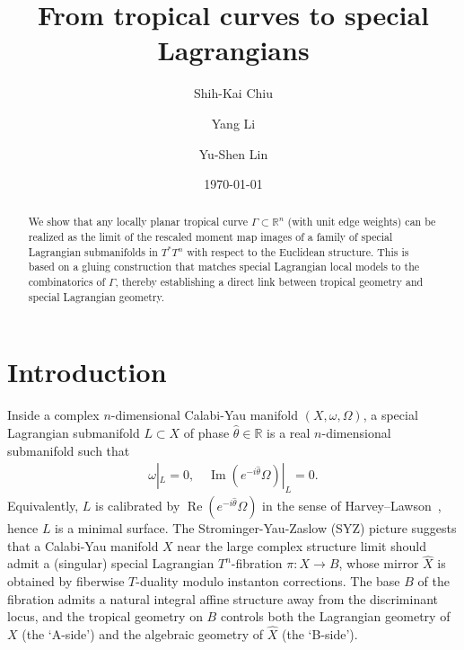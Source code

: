 \documentclass{article}
\date{\today}
\title{From tropical curves to special Lagrangians}
\author{Shih-Kai Chiu \and Yang Li \and Yu-Shen Lin}
\date{}
\theoremstyle{definition}
\newcommand{\R}{\mathbb{R}}
\begin{document}
	
	\maketitle
	
	
	
\begin{abstract}
  We show that any locally planar tropical curve $\Gamma \subset \mathbb{R}^n$ (with unit edge weights) can be realized as the limit of the rescaled moment map images of a family of special Lagrangian submanifolds in $T^*T^n$ with respect to the Euclidean structure. This is based on a gluing construction that matches special Lagrangian local models to the combinatorics of $\Gamma$, thereby establishing a direct link between tropical geometry and special Lagrangian geometry.
\end{abstract}	
	





    
    \section{Introduction}\label{sec: introduction}





Inside a complex $n$-dimensional Calabi-Yau manifold $(X,\omega, \Omega)$, a special Lagrangian submanifold $L\subset X$ of phase $\hat{\theta}\in \R$ is a real $n$-dimensional submanifold such that
    \begin{align*}
      \omega|_L = 0, \quad  \operatorname{Im}(e^{-i\hat\theta}\Omega)|_L=0.
    \end{align*}
 Equivalently, $L$ is calibrated by $\operatorname{Re}(e^{-i\hat\theta}\Omega)$ in the sense of Harvey–Lawson~\cite{HL}, hence $L$ is a minimal surface. The Strominger-Yau-Zaslow (SYZ) picture \cite{SYZ} suggests that a Calabi-Yau manifold $X$ near the large complex structure limit should admit a (singular) special Lagrangian $T^n$-fibration
$\pi: X \to B$,
    whose mirror $\hat X$ is obtained by fiberwise $T$-duality modulo instanton corrections. The base $B$ of the fibration admits a natural integral affine structure away from the discriminant locus, and the tropical geometry on $B$ controls both the Lagrangian geometry of $X$ (the `A-side') and the algebraic geometry of $\hat{X}$ (the `B-side').     
    
    
\end{document}
